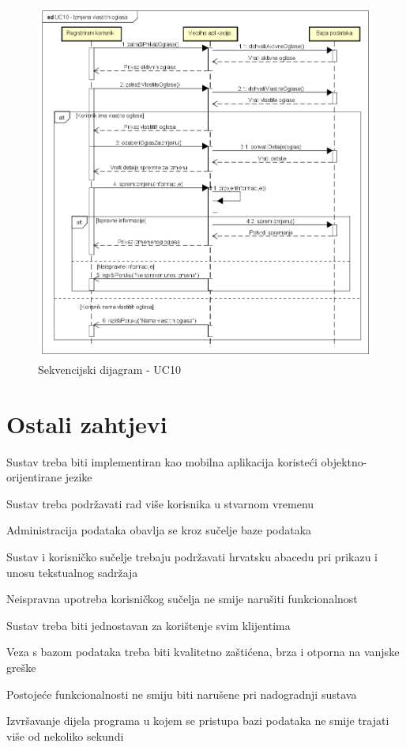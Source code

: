 					\begin{figure}[H]
						\includegraphics[scale=0.65]{dijagrami/sekvencijskiDijagrami/sd10} %
						\centering
						\caption{Sekvencijski dijagram - UC10}
						\label{fig:sDijagram10}
					\end{figure}
				
				\eject
	
		\section{Ostali zahtjevi}
		 
			\begin{packed_item}

				\item  Sustav treba biti implementiran kao mobilna aplikacija koristeći objektno-orijentirane jezike
				\item  Sustav treba podržavati rad više korisnika u stvarnom vremenu
				\item  Administracija podataka obavlja se kroz sučelje baze podataka
				\item  Sustav i korisničko sučelje trebaju podržavati hrvatsku abacedu pri prikazu i unosu tekstualnog sadržaja
				\item  Neispravna upotreba korisničkog sučelja ne smije narušiti funkcionalnost
				\item  Sustav treba biti jednostavan za korištenje svim klijentima
				\item  Veza s bazom podataka treba biti kvalitetno zaštićena, brza i otporna na vanjske greške
				\item  Postojeće funkcionalnosti ne smiju biti narušene pri nadogradnji sustava
				\item  Izvršavanje dijela programa u kojem se pristupa bazi podataka ne smije trajati više od nekoliko sekundi

			\end{packed_item}
			 
			 
			 
	